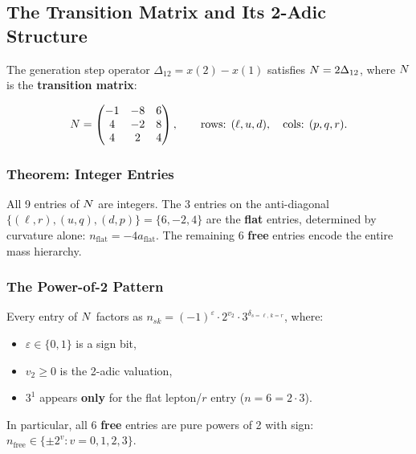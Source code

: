 \subsection{The Transition Matrix and Its 2-Adic Structure}\label{sec:transition_matrix}

The generation step operator $\Delta_{12} = x(2) - x(1)$ satisfies $N = 2\Delta_{12}$, where $N$ is the \textbf{transition matrix}:

\begin{equation}
N = \begin{pmatrix}
-1 & -8 & 6 \\
4 & -2 & 8 \\
4 & 2 & 4
\end{pmatrix}, \qquad \text{rows: } (\ell, u, d), \quad \text{cols: } (p, q, r).
\end{equation}

\subsubsection{Theorem: Integer Entries}

\begin{theorem}\label{thm:n_integer}
All 9 entries of $N$ are integers. The 3 entries on the anti-diagonal $\{(\ell, r), (u, q), (d, p)\} = \{6, -2, 4\}$ are the \textbf{flat} entries, determined by curvature alone: $n_{\mathrm{flat}} = -4a_{\mathrm{flat}}$. The remaining 6 \textbf{free} entries encode the entire mass hierarchy.
\end{theorem}

\subsubsection{The Power-of-2 Pattern}

\begin{theorem}\label{thm:2adic}
Every entry of $N$ factors as $n_{sk} = (-1)^{\varepsilon} \cdot 2^{v_2} \cdot 3^{\delta_{s=\ell,\,k=r}}$, where:
\begin{itemize}
\item $\varepsilon \in \{0, 1\}$ is a sign bit,
\item $v_2 \geq 0$ is the 2-adic valuation,
\item $3^1$ appears \textbf{only} for the flat lepton/$r$ entry ($n = 6 = 2 \cdot 3$).
\end{itemize}
In particular, all 6 \textbf{free} entries are pure powers of 2 with sign: $n_{\mathrm{free}} \in \{\pm 2^v : v = 0, 1, 2, 3\}$.
\end{theorem}

